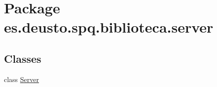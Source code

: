 \hypertarget{namespacees_1_1deusto_1_1spq_1_1biblioteca_1_1server}{}\section{Package es.\+deusto.\+spq.\+biblioteca.\+server}
\label{namespacees_1_1deusto_1_1spq_1_1biblioteca_1_1server}
\subsection*{Classes}
\begin{DoxyCompactItemize}
\item 
class \mbox{\hyperlink{classes_1_1deusto_1_1spq_1_1biblioteca_1_1server_1_1_server}{Server}}
\end{DoxyCompactItemize}
